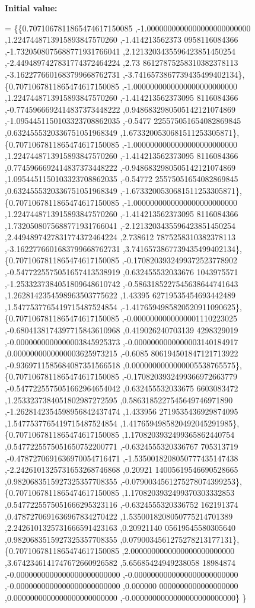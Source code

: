 {\bfseries Initial value\+:}
\begin{DoxyCode}
= \{\{0.7071067811865474617150085 ,-1.0000000000000000000000000 ,1.2247448713915893847570260 ,-1.414213562373
      0958116084366 ,-1.7320508075688771931766041 ,2.1213203435596423851450254 ,-2.4494897427831774372464224 ,2.73
      86127875258310382378113 ,-3.1622776601683799668762731 ,-3.7416573867739435499402134\},
\{0.7071067811865474617150085 ,-1.0000000000000000000000000 ,1.2247448713915893847570260 ,-1.414213562373095
      8116084366 ,-0.7745966692414837373448222 ,0.9486832980505142121074869 ,-1.0954451150103323708862035 ,-0.5477
      225575051654082869845 ,0.6324555320336751051968349 ,1.6733200530681511253305871\},
\{0.7071067811865474617150085 ,-1.0000000000000000000000000 ,1.2247448713915893847570260 ,-1.414213562373095
      8116084366 ,0.7745966692414837373448222 ,-0.9486832980505142121074869 ,1.0954451150103323708862035 ,-0.54772
      25575051654082869845 ,0.6324555320336751051968349 ,-1.6733200530681511253305871\},
\{0.7071067811865474617150085 ,-1.0000000000000000000000000 ,1.2247448713915893847570260 ,-1.414213562373095
      8116084366 ,1.7320508075688771931766041 ,-2.1213203435596423851450254 ,2.4494897427831774372464224 ,2.738612
      7875258310382378113 ,-3.1622776601683799668762731 ,3.7416573867739435499402134\},
\{0.7071067811865474617150085 ,-0.1708203932499372523778902 ,-0.5477225575051657413538919 ,0.632455532033676
      1043975571 ,-1.2533237384051809648610742 ,-0.5863185227545638644741643 ,1.2628142354598963503775622 ,1.43395
      62719535454693442489 ,1.5477537765419715487524854 ,-1.4176594985820520911090625\},
\{0.7071067811865474617150085 ,-0.0000000000000001110223025 ,-0.6804138174397715843610968 ,0.419026240703139
      4298329019 ,-0.0000000000000003845925373 ,-0.0000000000000003140184917 ,0.0000000000000003625973215 ,-0.6085
      806194501847121713922 ,-0.9369711585684087351566518 ,0.0000000000000005538765575\},
\{0.7071067811865474617150085 ,-0.1708203932499366972663779 ,-0.5477225575051662964654042 ,0.632455532033675
      6603083472 ,1.2533237384051802987272595 ,0.5863185227545649746971890 ,-1.2628142354598956842437474 ,1.433956
      2719535436929874095 ,1.5477537765419715487524854 ,1.4176594985820492045291985\},
\{0.7071067811865474617150085 ,1.1708203932499365862440754 ,0.5477225575051650752200771 ,-0.6324555320336767
      705313719 ,-0.4787270691636970054716471 ,-1.5350018208050777435147438 ,-2.2426101325731653268746868 ,0.20921
      14005619546690528665 ,0.9820683515927325357708355 ,-0.0790034561275278074399253\},
\{0.7071067811865474617150085 ,1.1708203932499370303332853 ,0.5477225575051666295323116 ,-0.6324555320336752
      162191374 ,0.4787270691636967834270422 ,1.5350018208050775214701389 ,2.2426101325731666591423163 ,0.20921140
      05619545580305640 ,0.9820683515927325357708355 ,0.0790034561275278213177131\},
\{0.7071067811865474617150085 ,2.0000000000000000000000000 ,3.6742346141747672660926582 ,5.65685424949238058
      18984874 ,-0.0000000000000000000000000 ,-0.0000000000000000000000000 ,-0.0000000000000000000000000 ,0.000000
      0000000000000000000 ,0.0000000000000000000000000 ,-0.0000000000000000000000000\}
\}
\end{DoxyCode}
